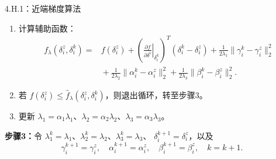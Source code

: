 \begin{bookalgorithm}{4.H.1：近端梯度算法}
\begin{enumerate}
\[\]
\item 计算辅助函数：
\[
\begin{aligned}
f_\lambda(\delta_i^z,\delta_i^k)={}&f(\delta_i^z)
+\left(\left.\frac{\partial f}{\partial\delta^i}\right|_{\delta_i^k}\right)^T
(\delta_i^k-\delta_i^z)
+\frac1{2\lambda_1}\|\gamma_i^k-\gamma_i^z\|_2^2\\
&{}+\frac1{2\lambda_2}\|\alpha_i^k-\alpha_i^z\|_2^2
+\frac1{2\lambda_3}\|\beta_i^k-\beta_i^z\|_2^2.
\end{aligned}
\]
\item 若 $f(\delta_i^z)\le\widehat f_\lambda(\delta_i^z,\delta_i^k)$，则退出循环，转至步骤3。
\item 更新 $\lambda_1=\alpha_1\lambda_1$、$\lambda_2=\alpha_2\lambda_2$、$\lambda_3=\alpha_3\lambda_3$。
\end{enumerate}
\textbf{步骤3：}令 $\lambda_1^k=\lambda_1$、$\lambda_2^k=\lambda_2$、$\lambda_3^k=\lambda_3$、
$\delta_i^{k+1}=\delta_i^z$，以及
\[
\gamma_i^{k+1}=\gamma_i^z,\quad\alpha_i^{k+1}=\alpha_i^z,\quad
\beta_i^{k+1}=\beta_i^z,\quad k=k+1.
\]
\end{bookalgorithm}
